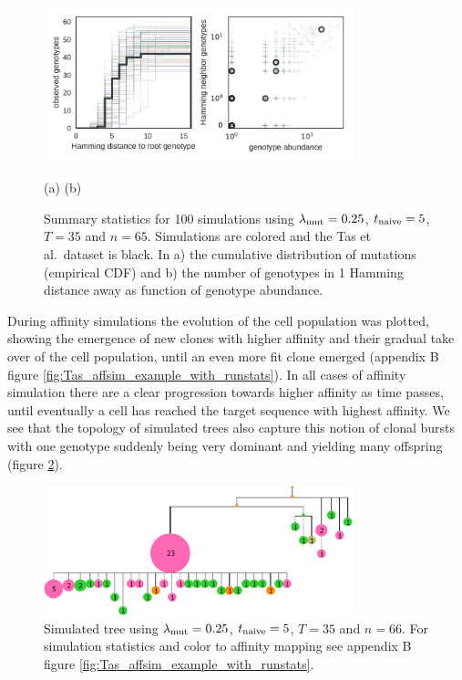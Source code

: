 \begin{figure}
    \begin{center}
    \includegraphics[width=0.8\textwidth]{figures/Tas-affsim_Tas-data.pdf}\newline%
    \end{center}
    \vspace{-14mm} \hspace{42mm} (a) \hspace{52mm} (b)
    \caption{
        \label{fig:Tas-affsim_Tas-data}
        Summary statistics for 100 simulations using $\lambda_{\text{mut}}=0.25$, $t_{\text{naive}}=5$, $T=35$ and $n=65$.
        Simulations are colored and the Tas et al.\ dataset is black.
        In a) the cumulative distribution of mutations (empirical CDF) and b) the number of genotypes in 1 Hamming distance away as function of genotype abundance.
    }
\end{figure}


During affinity simulations the evolution of the cell population was plotted, showing the emergence of new clones with higher affinity and their gradual take over of the cell population, until an even more fit clone emerged (appendix B figure \ref{fig:Tas_affsim_example_with_runstats}).
In all cases of affinity simulation there are a clear progression towards higher affinity as time passes, until eventually a cell has reached the target sequence with highest affinity.
We see that the topology of simulated trees also capture this notion of clonal bursts with one genotype suddenly being very dominant and yielding many offspring (figure \ref{fig:Tas_affsim_example.collapsed_runstat_color_tree}).

\begin{figure}
    \centering
    \includegraphics[width=0.8\textwidth]{figures/Tas_affsim_example_collapsed_runstat_color_tree.pdf}
    \caption{
        \label{fig:Tas_affsim_example.collapsed_runstat_color_tree}
        Simulated tree using $\lambda_{\text{mut}}=0.25$, $t_{\text{naive}}=5$, $T=35$ and $n=66$.
        For simulation statistics and color to affinity mapping see appendix B figure \ref{fig:Tas_affsim_example_with_runstats}.
    }
\end{figure}





